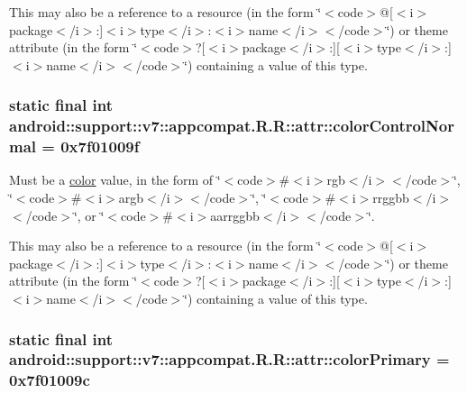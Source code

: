 This may also be a reference to a resource (in the form \char`\"{}$<$code$>$@\mbox{[}$<$i$>$package$<$/i$>$:\mbox{]}$<$i$>$type$<$/i$>$:$<$i$>$name$<$/i$>$$<$/code$>$\char`\"{}) or theme attribute (in the form \char`\"{}$<$code$>$?\mbox{[}$<$i$>$package$<$/i$>$:\mbox{]}\mbox{[}$<$i$>$type$<$/i$>$:\mbox{]}$<$i$>$name$<$/i$>$$<$/code$>$\char`\"{}) containing a value of this type. \hypertarget{classandroid_1_1support_1_1v7_1_1appcompat_1_1_r_1_1attr_093a3eb299ce215468c9739c0906afee}{
\subsubsection[{colorControlNormal}]{\setlength{\rightskip}{0pt plus 5cm}static final int android::support::v7::appcompat.R.R::attr::colorControlNormal = 0x7f01009f}}
\label{classandroid_1_1support_1_1v7_1_1appcompat_1_1_r_1_1attr_093a3eb299ce215468c9739c0906afee}


Must be a \hyperlink{classandroid_1_1support_1_1v7_1_1appcompat_1_1_r_1_1color}{color} value, in the form of \char`\"{}$<$code$>$\#$<$i$>$rgb$<$/i$>$$<$/code$>$\char`\"{}, \char`\"{}$<$code$>$\#$<$i$>$argb$<$/i$>$$<$/code$>$\char`\"{}, \char`\"{}$<$code$>$\#$<$i$>$rrggbb$<$/i$>$$<$/code$>$\char`\"{}, or \char`\"{}$<$code$>$\#$<$i$>$aarrggbb$<$/i$>$$<$/code$>$\char`\"{}. 

This may also be a reference to a resource (in the form \char`\"{}$<$code$>$@\mbox{[}$<$i$>$package$<$/i$>$:\mbox{]}$<$i$>$type$<$/i$>$:$<$i$>$name$<$/i$>$$<$/code$>$\char`\"{}) or theme attribute (in the form \char`\"{}$<$code$>$?\mbox{[}$<$i$>$package$<$/i$>$:\mbox{]}\mbox{[}$<$i$>$type$<$/i$>$:\mbox{]}$<$i$>$name$<$/i$>$$<$/code$>$\char`\"{}) containing a value of this type. \hypertarget{classandroid_1_1support_1_1v7_1_1appcompat_1_1_r_1_1attr_90742f1c4091e0ed06f41d54876c6e13}{
\subsubsection[{colorPrimary}]{\setlength{\rightskip}{0pt plus 5cm}static final int android::support::v7::appcompat.R.R::attr::colorPrimary = 0x7f01009c}}
\label{classandroid_1_1support_1_1v7_1_1appcompat_1_1_r_1_1attr_90742f1c4091e0ed06f41d54876c6e13}


